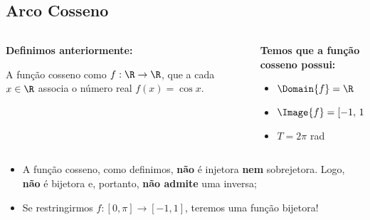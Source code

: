 \subsection{Arco Cosseno}
\begin{frame}
  \begin{columns}[onlytextwidth]
    \begin{column}{0.49\textwidth}\vspace{-0.5cm}
      \begin{highlight}
        \textbf{Definimos anteriormente:}

        A função cosseno como $f:\R\rightarrow\R$, que a cada $x\in\R$ associa o número real $f(x)=\cos{x}$.
      \end{highlight}
    \end{column}
    \begin{column}{0.49\textwidth}\vspace*{-0.5cm}
      \begin{highlight}
        \textbf{Temos que a função cosseno possui:}
        \begin{itemize}
          \item $\Domain{f} = \R$
          \item $\Image{f} = [-1,\,1]$
          \item $T = 2\pi$ rad
        \end{itemize}
      \end{highlight}
    \end{column}
  \end{columns}
  \begin{figure}
  \end{figure}
  \vspace*{-1.2em}
  \begin{itemize}
    \item A função cosseno, como definimos, \textbf{não} é injetora \textbf{nem} sobrejetora. Logo, \textbf{não} é bijetora e, portanto, \textbf{não admite} uma inversa;
    \item<2> Se restringirmos $f:[0,\pi]\rightarrow[-1,1]$, teremos uma função bijetora!
  \end{itemize}
\end{frame}

